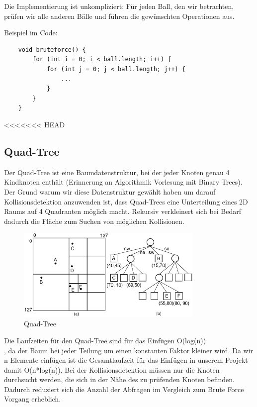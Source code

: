 \documentclass[12pt,a4paper]{article}
\begin{document}
Die Implementierung ist unkompliziert: Für jeden Ball, den wir betrachten, prüfen wir alle anderen Bälle und führen die gewünschten Operationen aus.

\vspace{0.5cm}
Beispiel im Code:

\begin{verbatim}
	void bruteforce() {
		for (int i = 0; i < ball.length; i++) {
			for (int j = 0; j < ball.length; j++) {
				...
			}
		}
	}
\end{verbatim}
	
	
	
	
	
	
	
	
<<<<<<< HEAD
	\subsection{Quad-Tree}
	Der Quad-Tree ist eine Baumdatenstruktur, bei der jeder Knoten genau 4 Kindknoten enthält (Erinnerung an Algorithmik Vorlesung mit Binary Trees). Der Grund warum wir diese Datenstruktur gewählt haben um darauf Kollisionsdetektion anzuwenden ist, dass Quad-Trees eine Unterteilung eines 2D Raums auf 4 Quadranten möglich macht. Rekursiv verkleinert sich bei Bedarf dadurch die Fläche zum Suchen von möglichen Kollisionen.
	\begin{figure}[H]
		\centering 
		\includegraphics[width=0.8\textwidth]{quadtree.png}  
		\caption{Quad-Tree  \cite{quadtree_example}} 
		\label{Bild: Beispiel Quadtree}  
	\end{figure}
	Die Laufzeiten für den Quad-Tree sind für das Einfügen O(log(n)) \cite{quadtree_source}~ \\, da der Baum bei jeder Teilung um einen konstanten Faktor kleiner wird. Da wir n Elemente einfügen ist die Gesamtlaufzeit für das Einfügen in unserem Projekt damit O(n*log(n)). 
	Bei der Kollisionsdetektion müssen nur die Knoten durchsucht werden, die sich in der Nähe des zu prüfenden Knoten befinden. Dadurch reduziert sich die Anzahl der Abfragen im Vergleich zum Brute Force Vorgang erheblich.
\end{document}

